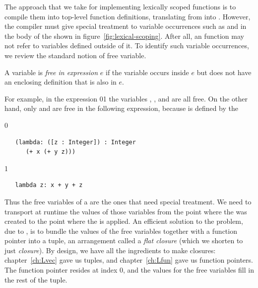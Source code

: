 \documentclass[7x10]{TimesAPriori_MIT}%
\def\racketEd{0}
\def\pythonEd{1}
\def\edition{1}
\newcommand{\racket}[1]{{\if\edition\racketEd{#1}\fi}}
\newcommand{\pythonColor}[0]{}
\newcommand{\python}[1]{{\if\edition\pythonEd\pythonColor #1\fi}}
\numberwithin{theorem}{chapter}
\numberwithin{definition}{chapter}
\numberwithin{equation}{chapter}
\begin{document}
The approach that we take for implementing lexically scoped functions
is to compile them into top-level function definitions, translating
from \LangLam{} into \LangFun{}.  However, the compiler must give
special treatment to variable occurrences such as  and
 in the body of the  shown in
figure~\ref{fig:lexical-scoping}. After all, an \LangFun{} function
may not refer to variables defined outside of it. To identify such
variable occurrences, we review the standard notion of free variable.

\begin{definition}\normalfont
A variable is \emph{free in expression} $e$ if the variable occurs
inside $e$ but does not have an enclosing definition that is also in
$e$.
\end{definition}

For example, in the expression
\racket{}\python{}
the variables , , and  are all free.  On the other hand,
only  and  are free in the following expression,
because  is defined by the 
{\if\edition\racketEd
\begin{lstlisting}
   (lambda: ([z : Integer]) : Integer
      (+ x (+ y z)))
\end{lstlisting}
\fi}
{\if\edition\pythonEd\pythonColor
\begin{lstlisting}
   lambda z: x + y + z
\end{lstlisting}
\fi}
%
\noindent Thus the free variables of a  are the ones that
need special treatment. We need to transport at runtime the values
of those variables from the point where the  was created
to the point where the  is applied. An efficient solution
to the problem, due to \citet{Cardelli:1983aa}, is to bundle the
values of the free variables together with a function pointer into a
tuple, an arrangement called a \emph{flat closure} (which we shorten
to just \emph{closure}).
%
By design, we have all the ingredients to make closures:
chapter~\ref{ch:Lvec} gave us tuples, and chapter~\ref{ch:Lfun} gave us
function pointers. The function pointer resides at index $0$, and the
values for the free variables fill in the rest of the tuple.
\end{document}
